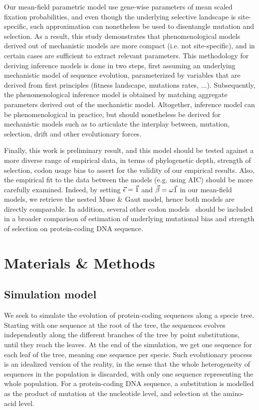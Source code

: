 Our mean-field parametric model use gene-wise parameters of mean scaled fixation probabilities, and even though the underlying selective landscape is site-specific, such approximation can nonetheless be used to disentangle mutation and selection.
As a result, this study demonstrates that phenomenological models derived out of mechanistic models are more compact (i.e. not site-specific), and in certain cases are sufficient to extract relevant parameters.
This methodology for deriving inference models is done in two steps, first assuming an underlying mechanistic model of sequence evolution, parameterized by variables that are derived from first principles (fitness landscape, mutations rates, $\hdots$).
Subsequently, the phenomenological inference model is obtained by matching aggregate parameters derived out of the mechanistic model.
Altogether, inference model can be phenomenological in practice, but should nonetheless be derived for mechanistic models such as to articulate the interplay between, mutation, selection, drift and other evolutionary forces.

Finally, this work is preliminary result, and this model should be tested against a more diverse range of empirical data, in terms of phylogenetic depth, strength of selection, codon usage bias to assert for the validity of our empirical results.
Also, the empirical fit to the data between the models (e.g. using AIC) should be more carefully examined.
Indeed, by setting $\vec{\epsilon} = \vec{1}$ and $\vec{\beta} = \omega \vec{1}$ in our mean-field models, we retrieve the nested Muse \& Gaut model, hence both models are directly comparable.
In addition, several other codon models~\citep{Rodrigue2008a,KosakovskyPond2020} should be included in a broader comparison of estimation of underlying mutational bias and strength of selection on protein-coding DNA sequence.


\section{Materials \& Methods}

\subsection{Simulation model}
\label{sec:mut-bias-simu}
We seek to simulate the evolution of protein-coding sequences along a specie tree.
Starting with one sequence at the root of the tree, the sequences evolves independently along the different branches of the tree by point substitutions, until they reach the leaves.
At the end of the simulation, we get one sequence for each leaf of the tree, meaning one sequence per specie.
Such evolutionary process is an idealized version of the reality, in the sense that the whole heterogeneity of sequences in the population is discarded, with only one sequence representing the whole population.
For a protein-coding \acrshort{DNA} sequence, a substitution is modelled as the product of mutation at the nucleotide level, and selection at the amino-acid level.

